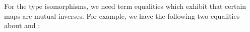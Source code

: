 \begin{AgdaAlign}
For the type isomorphisms, we need term equalities which exhibit that certain maps are mutual inverses.
For example, we have the following two equalities about  and :

\begin{code}%
%
\>[4]\AgdaSpace{}%
\AgdaSymbol{:}\AgdaSpace{}%
\AgdaSpace{}%
\AgdaSymbol{\{}\AgdaSymbol{\}}\AgdaSpace{}%
\AgdaSymbol{\{}\AgdaSymbol{\}}\AgdaSpace{}%
\AgdaSymbol{(}\AgdaSpace{}%
\AgdaSymbol{:}\AgdaSpace{}%
\AgdaSpace{}%
\AgdaSpace{}%
\AgdaSymbol{(}\AgdaSpace{}%
\AgdaSymbol{(}\AgdaSpace{}%
\AgdaSymbol{)))}\AgdaSpace{}%
\AgdaSpace{}%
\AgdaSpace{}%
\AgdaSpace{}%
\AgdaOperator{\AgdaFunction{\$}}\AgdaSpace{}%
\AgdaSymbol{(}\AgdaSpace{}%
\AgdaSpace{}%
\AgdaOperator{\AgdaFunction{\$}}\AgdaSpace{}%
\AgdaSymbol{)}\AgdaSpace{}%
\AgdaSpace{}%
\<%
\\
%
\>[4]\AgdaSpace{}%
\AgdaSymbol{:}\AgdaSpace{}%
\AgdaSpace{}%
\AgdaSymbol{\{}\AgdaSymbol{\}}\AgdaSpace{}%
\AgdaSymbol{\{}\AgdaSymbol{\}}\AgdaSpace{}%
\AgdaSymbol{(}\AgdaSpace{}%
\AgdaSymbol{:}\AgdaSpace{}%
\AgdaSpace{}%
\AgdaSpace{}%
\AgdaSymbol{)}\AgdaSpace{}%
\AgdaSpace{}%
\AgdaSpace{}%
\AgdaSpace{}%
\AgdaOperator{\AgdaFunction{\$}}\AgdaSpace{}%
\AgdaSymbol{(}\AgdaSpace{}%
\AgdaSpace{}%
\AgdaOperator{\AgdaFunction{\$}}\AgdaSpace{}%
\AgdaSymbol{)}\AgdaSpace{}%
\AgdaSpace{}%
\<%
\end{code}


\end{AgdaAlign}
